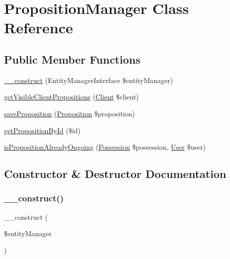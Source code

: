 \hypertarget{class_app_1_1_b_l_1_1_proposition_manager}{}\section{Proposition\+Manager Class Reference}
\label{class_app_1_1_b_l_1_1_proposition_manager}
\subsection*{Public Member Functions}
\begin{DoxyCompactItemize}
\item 
\mbox{\hyperlink{class_app_1_1_b_l_1_1_proposition_manager_abb5fb9a65dd8a81e7482dddbf71c5177}{\+\_\+\+\_\+construct}} (Entity\+Manager\+Interface \$entity\+Manager)
\item 
\mbox{\hyperlink{class_app_1_1_b_l_1_1_proposition_manager_aa81d32fba76dd49892b709e948e72ba8}{get\+Visible\+Client\+Propositions}} (\mbox{\hyperlink{class_app_1_1_entity_1_1_client}{Client}} \$client)
\item 
\mbox{\hyperlink{class_app_1_1_b_l_1_1_proposition_manager_acd4da639f496d537ba9e1638289e69ac}{save\+Proposition}} (\mbox{\hyperlink{class_app_1_1_entity_1_1_proposition}{Proposition}} \$proposition)
\item 
\mbox{\hyperlink{class_app_1_1_b_l_1_1_proposition_manager_a1ca3dd3ecd86e6bebe9dadadd01c8eda}{get\+Proposition\+By\+Id}} (\$id)
\item 
\mbox{\hyperlink{class_app_1_1_b_l_1_1_proposition_manager_a91d156c9b416197b35c0ffbbaf78df2c}{is\+Proposition\+Already\+Ongoing}} (\mbox{\hyperlink{class_app_1_1_entity_1_1_possession}{Possession}} \$possession, \mbox{\hyperlink{class_app_1_1_entity_1_1_user}{User}} \$user)
\end{DoxyCompactItemize}


\subsection{Constructor \& Destructor Documentation}
\mbox{\label{class_app_1_1_b_l_1_1_proposition_manager_abb5fb9a65dd8a81e7482dddbf71c5177}} 
\subsubsection{\texorpdfstring{\_\_construct()}{\_\_construct()}}
{\footnotesize\ttfamily \+\_\+\+\_\+construct (\begin{DoxyParamCaption}\item[{Entity\+Manager\+Interface}]{\$entity\+Manager }\end{DoxyParamCaption})}

